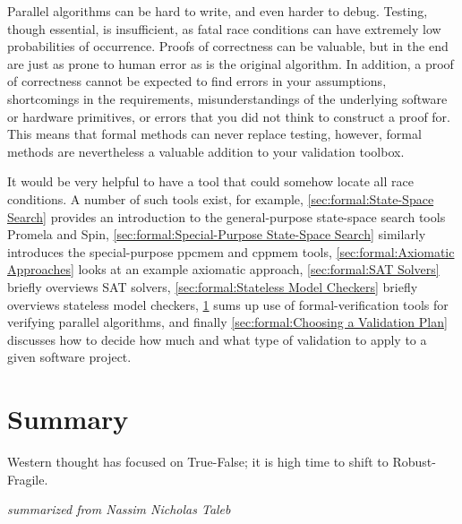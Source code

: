 
%


Parallel algorithms can be hard to write, and even harder to debug.
Testing, though essential, is insufficient, as fatal race conditions
can have extremely low probabilities of occurrence.
Proofs of correctness can be valuable, but in the end are just as
prone to human error as is the original algorithm.
In addition, a proof of correctness cannot be expected to find errors
in your assumptions, shortcomings in the requirements,
misunderstandings of the underlying software or hardware primitives,
or errors that you did not think to construct a proof for.
This means that formal methods can never replace testing, however,
formal methods are nevertheless a valuable addition to your validation toolbox.

It would be very helpful to have a tool that could somehow locate
all race conditions.
A number of such tools exist, for example,
\cref{sec:formal:State-Space Search} provides an
introduction to the general-purpose state-space search tools Promela and Spin,
\cref{sec:formal:Special-Purpose State-Space Search}
similarly introduces the special-purpose ppcmem and cppmem tools,
\cref{sec:formal:Axiomatic Approaches}
looks at an example axiomatic approach,
\cref{sec:formal:SAT Solvers}
briefly overviews SAT solvers,
\cref{sec:formal:Stateless Model Checkers}
briefly overviews stateless model checkers,
\cref{sec:formal:Summary}
sums up use of formal-verification tools for verifying parallel algorithms,
and finally
\cref{sec:formal:Choosing a Validation Plan}
discusses how to decide how much and what type of validation to apply
to a given software project.








\section{Summary}
\label{sec:formal:Summary}
%
\epigraph{Western thought has focused on True-False;
	  it is high time to shift to Robust-Fragile.}
	 {\emph{summarized from Nassim Nicholas Taleb}}

